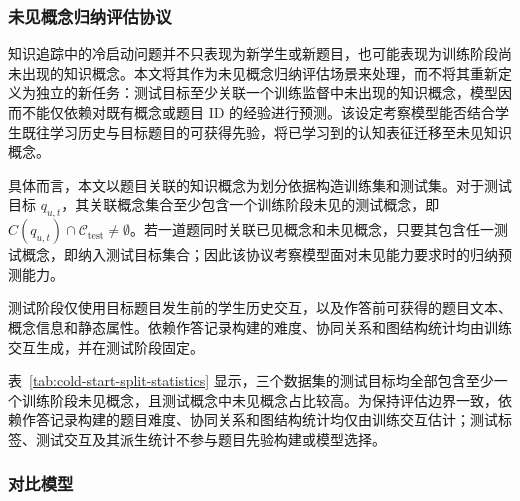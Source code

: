 \documentclass[UTF8,a4paper,12pt]{ctexart}
\numberwithin{table}{section}
\begin{document}
\subsubsection{未见概念归纳评估协议}

知识追踪中的冷启动问题并不只表现为新学生或新题目，也可能表现为训练阶段尚未出现的知识概念。本文将其作为未见概念归纳评估场景来处理，而不将其重新定义为独立的新任务：测试目标至少关联一个训练监督中未出现的知识概念，模型因而不能仅依赖对既有概念或题目 ID 的经验进行预测。该设定考察模型能否结合学生既往学习历史与目标题目的可获得先验，将已学习到的认知表征迁移至未见知识概念。

具体而言，本文以题目关联的知识概念为划分依据构造训练集和测试集。对于测试目标 \(q_{u,t}\)，其关联概念集合至少包含一个训练阶段未见的测试概念，即 \(C(q_{u,t})\cap\mathcal{C}_{\mathrm{test}}\neq\emptyset\)。若一道题同时关联已见概念和未见概念，只要其包含任一测试概念，即纳入测试目标集合；因此该协议考察模型面对未见能力要求时的归纳预测能力。

测试阶段仅使用目标题目发生前的学生历史交互，以及作答前可获得的题目文本、概念信息和静态属性。依赖作答记录构建的难度、协同关系和图结构统计均由训练交互生成，并在测试阶段固定。

\begin{table}[H]
\centering
\small
\caption{未见概念归纳评估的划分统计}
\label{tab:cold-start-split-statistics}
\end{table}

表~\ref{tab:cold-start-split-statistics} 显示，三个数据集的测试目标均全部包含至少一个训练阶段未见概念，且测试概念中未见概念占比较高。为保持评估边界一致，依赖作答记录构建的题目难度、协同关系和图结构统计均仅由训练交互估计；测试标签、测试交互及其派生统计不参与题目先验构建或模型选择。

\subsubsection{对比模型}
\end{document}
